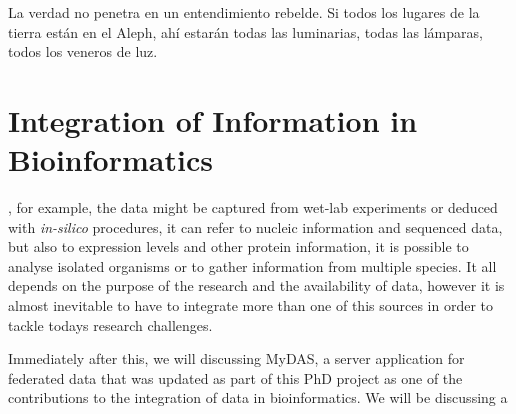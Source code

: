 \begin{savequote}[75mm] 
La verdad no penetra en un entendimiento rebelde. Si todos los lugares de la tierra est\'{a}n en el Aleph, ah\'{i} estar\'{a}n todas las luminarias, todas las l\'{a}mparas, todos los veneros de luz.
\end{savequote}

\chapter{Integration of Information in Bioinformatics} \label{section:integration}

, for example, the data might be captured from wet-lab experiments or deduced with \emph{in-silico} procedures, it can refer to nucleic information and sequenced data, but also to expression levels and other protein information, it is possible to analyse isolated organisms or to gather information from multiple species. It all depends on the purpose of the research and the availability of data, however it is almost inevitable to have to integrate more than one of this sources in order to tackle todays research challenges.

Immediately after this, we will discussing MyDAS, a server application for federated data that was updated as part of this PhD project as one of the contributions to the integration of data in bioinformatics. We will be discussing a 

